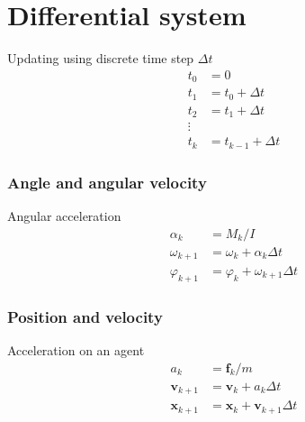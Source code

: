 \section{Differential system}
Updating using discrete time step $ \Delta t $
\begin{align}
t_{0} &= 0 \\
t_{1} &= t_{0} + \Delta t \\
t_{2} &= t_{1} + \Delta t \\
\vdots \\
t_{k} &= t_{k-1} + \Delta t
\end{align}


\subsubsection{Angle and angular velocity}
Angular acceleration
\begin{align}
\alpha_{k} &= M_{k} / I \\
\omega_{k+1} &= \omega_{k} + \alpha_{k} \Delta t \\
\varphi_{k+1} &= \varphi_{k} + \omega_{k+1} \Delta t
\end{align}


\subsubsection{Position and velocity}
Acceleration on an agent
\begin{align}
a_{k} &= \mathbf{f}_{k} / m \\
\mathbf{v}_{k+1} &= \mathbf{v}_{k} + a_{k} \Delta t \\
\mathbf{x}_{k+1} &= \mathbf{x}_{k} + \mathbf{v}_{k+1} \Delta t
\end{align}

